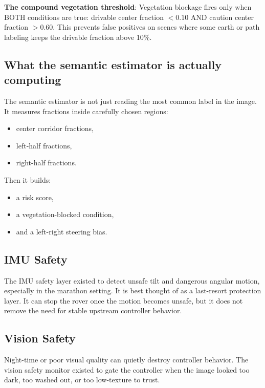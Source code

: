 \documentclass[11pt]{article}
\begin{document}
\textbf{The compound vegetation threshold}: Vegetation blockage fires only when BOTH
conditions are true: drivable center fraction $< 0.10$ AND caution center fraction $>
0.60$. This prevents false positives on scenes where some earth or path labeling keeps
the drivable fraction above 10\%.

\subsection{What the semantic estimator is actually computing}

The semantic estimator is not just reading the most common label in the image. It
measures fractions inside carefully chosen regions:

\begin{itemize}[nosep]
  \item center corridor fractions,
  \item left-half fractions,
  \item right-half fractions.
\end{itemize}

Then it builds:

\begin{itemize}[nosep]
  \item a risk score,
  \item a vegetation-blocked condition,
  \item and a left-right steering bias.
\end{itemize}

\subsection{IMU Safety}

The IMU safety layer existed to detect unsafe tilt and dangerous angular motion,
especially in the marathon setting. It is best thought of as a last-resort
protection layer. It can stop the rover once the motion becomes unsafe, but it does
not remove the need for stable upstream controller behavior.

\subsection{Vision Safety}

Night-time or poor visual quality can quietly destroy controller behavior. The
vision safety monitor existed to gate the controller when the image looked too dark,
too washed out, or too low-texture to trust.
\end{document}
